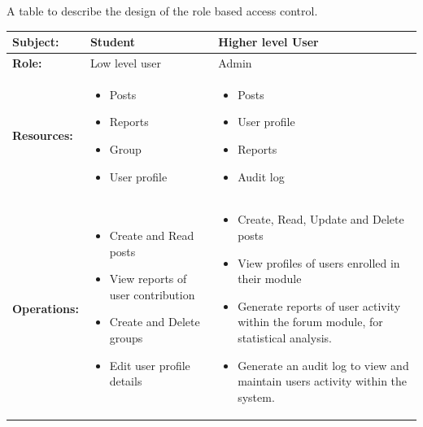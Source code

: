 \documentclass[12pt]{article}
\begin{document}
\smallskip
\par{A table to describe the design of the role based access control.}
\begin{center}
	\begin{tabu} to 1.2\textwidth{ | X[l] | X[c] | X[r] | }
    	\hline
        	\textbf{Subject:} & Student & Higher level User \\
        \hline 
         	\textbf{Role:} & Low level user & Admin \\
        \hline 
          	 \textbf{Resources:} & \begin{itemize}
                                     \item{Posts}
                                     \item{Reports}
                                     \item{Group}
                                     \item{User profile}
                                   \end{itemize} 
                                 & \begin {itemize} 
									  \item{Posts}
                                      \item{User profile}
                                      \item{Reports}
                                      \item{Audit log}
                                    \end{itemize} \\
        \hline
        	\textbf{Operations:} & \begin {itemize}
  								     \item{Create and Read posts}
                                     \item{View reports of user contribution}
                                     \item{Create and Delete groups}
                                     \item{Edit user profile details}
                                   \end{itemize}
           						 & \begin{itemize} 
                                 	\item{Create, Read, Update and Delete posts}
                                    \item{View profiles of users enrolled in their module}
                                    \item{Generate reports of user activity within the forum module, for statistical analysis.}
                                    \item{Generate an audit log to view and maintain users activity within the system.}
                                  \end{itemize} \\
        \hline 
    \end{tabu}   
\end{center}
\end{document}
